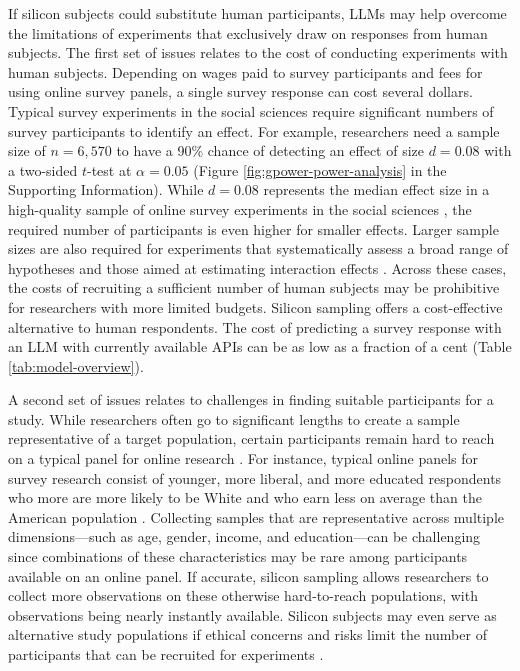 \documentclass{article}
\begin{document}
If silicon subjects could substitute human participants, LLMs may help overcome the limitations of experiments that exclusively draw on responses from human subjects. The first set of issues relates to the cost of conducting experiments with human subjects. Depending on wages paid to survey participants and fees for using online survey panels, a single survey response can cost several dollars. Typical survey experiments in the social sciences require significant numbers of survey participants to identify an effect. For example, researchers need a sample size of $n=6,570$ to have a 90\% chance of detecting an effect of size $d=0.08$ with a two-sided $t$-test at $\alpha=0.05$ (Figure \ref{fig:gpower-power-analysis} in the Supporting Information). While $d=0.08$ represents the median effect size in a high-quality sample of online survey experiments in the social sciences \citep{rauf_audit_2024}, the required number of participants is even higher for smaller effects. Larger sample sizes are also required for experiments that systematically assess a broad range of hypotheses \citep{dellavigna_what_2018,milkman_megastudies_2021,voelkel_megastudy_2023, tappin_quantifying_2023} and those aimed at estimating interaction effects \citep{gelman_you_2018}. Across these cases, the costs of recruiting a sufficient number of human subjects may be prohibitive for researchers with more limited budgets. Silicon sampling offers a cost-effective alternative to human respondents. The cost of predicting a survey response with an LLM with currently available APIs can be as low as a fraction of a cent (Table \ref{tab:model-overview}). 

A second set of issues relates to challenges in finding suitable participants for a study. While researchers often go to significant lengths to create a sample representative of a target population, certain participants remain hard to reach on a typical panel for online research \citep{chandler_online_2019}. For instance, typical online panels for survey research consist of younger, more liberal, and more educated respondents who more are more likely to be White and who earn less on average than the American population \citep{berinsky_evaluating_2012, levay_demographic_2016, zack_can_2019}. Collecting samples that are representative across multiple dimensions---such as age, gender, income, and education---can be challenging since combinations of these characteristics may be rare among participants available on an online panel. If accurate, silicon sampling allows researchers to collect more observations on these otherwise hard-to-reach populations, with observations being nearly instantly available. Silicon subjects may even serve as alternative study populations if ethical concerns and risks limit the number of participants that can be recruited for experiments \citep{grossmann_ai_2023,bail_can_2024}.   
\end{document}
